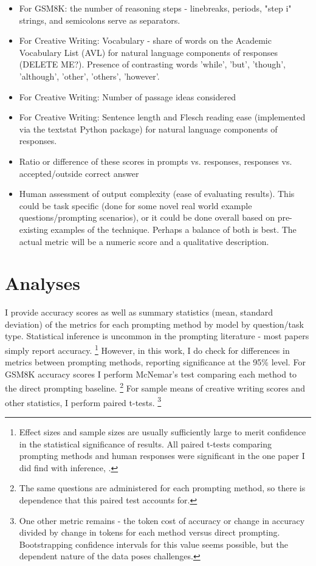 \documentclass[11pt]{article}
\begin{document}
\begin{itemize}
  \item For GSM8K: the number of reasoning steps - linebreaks, periods, "step i" strings, and semicolons serve as separators. \cite{fu_complexity-based_2023}
  \item For Creative Writing: Vocabulary - share of words on the Academic Vocabulary List (AVL) for natural language components of responses (DELETE ME?). \cite{gardner_new_2014} Presence of contrasting words {'while', 'but', 'though', 'although', 'other', 'others', 'however'}. \cite{bhaskar_prompted_2023}
  \item For Creative Writing: Number of passage ideas considered
  \item For Creative Writing: Sentence length and Flesch reading ease (implemented via the textstat Python package) for natural language components of responses. \cite{flesch_how_2016, aggarwal_textstat_nodate}
  \item Ratio or difference of these scores in prompts vs. responses, responses vs. accepted/outside correct answer
  \item Human assessment of output complexity (ease of evaluating results). This could be task specific (done for some novel real world example questions/prompting scenarios), or it could be done overall based on pre-existing examples of the technique. Perhaps a balance of both is best. The actual metric will be a numeric score and a qualitative description.
\end{itemize}

\section*{Analyses}

I provide accuracy scores as well as summary statistics (mean, standard deviation) of the metrics for each prompting method by model by question/task type. Statistical inference is uncommon in the prompting literature - most papers simply report accuracy. \footnote{Effect sizes and sample sizes are usually sufficiently large to merit confidence in the statistical significance of results. All paired t-tests comparing prompting methods and human responses were significant in the one paper I did find with inference, \citealp{pu_chatgpt_2023}.} However, in this work, I do check for differences in metrics between prompting methods, reporting significance at the 95\% level. For GSM8K accuracy scores I perform McNemar's test comparing each method to the direct prompting baseline. \footnote{The same questions are administered for each prompting method, so there is dependence that this paired test accounts for.} For sample means of creative writing scores and other statistics, I perform paired t-tests. \footnote{One other metric remains - the token cost of accuracy or change in accuracy divided by change in tokens for each method versus direct prompting. Bootstrapping confidence intervals for this value seems possible, but the dependent nature of the data poses challenges.}
\end{document}
